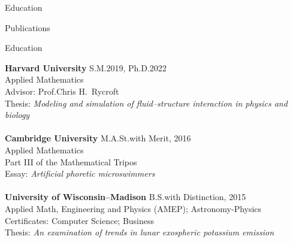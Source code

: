 \documentclass{cv}
\makeatletter
\newlength{\bibsep}
 {\@listi \global\bibsep\itemsep \global\advance\bibsep by\parsep}
\newenvironment{bibenum*}
  {\renewcommand\labelenumi{\makebox[1.25em][l]{[\theenumi]}}%
   \etaremune[
     topsep=0pt,
     itemsep=\bibsep,
     labelwidth=1.25em,
     parsep=0pt,partopsep=0pt,leftmargin={\labelsep+\labelwidth}]}
  {\endetaremune}
\makeatother
\begin{document}

\begin{cvSection}{Education}




\end{cvSection}

\begin{cvSection}{Publications}
\begin{bibenum*}
  \item {}
  \item {}
  \item {}
  \item {}
\end{bibenum*}
\end{cvSection}

\begin{rSection}{Education}

{\bf Harvard University} \hfill S.M.\@ 2019, Ph.D.\@ 2022 
\\ Applied Mathematics
\\ Advisor: Prof.\@ Chris H.~Rycroft
	\\ Thesis: \textit{Modeling and simulation of fluid--structure interaction in physics and biology}\\
\\{\bf Cambridge University} \hfill M.A.St.\@ with Merit, 2016 
\\ Applied Mathematics
\\ Part III of the Mathematical Tripos
	\\ Essay: \textit{Artificial phoretic microswimmers} \\
\\{\bf University of Wisconsin--Madison} \hfill B.S.\@ with Distinction, 2015 
\\ Applied Math, Engineering and Physics (AMEP); Astronomy-Physics
\\ Certificates: Computer Science; Business
	\\ Thesis: \textit{An examination of trends in lunar exospheric potassium emission}
\end{rSection}
\end{document}
